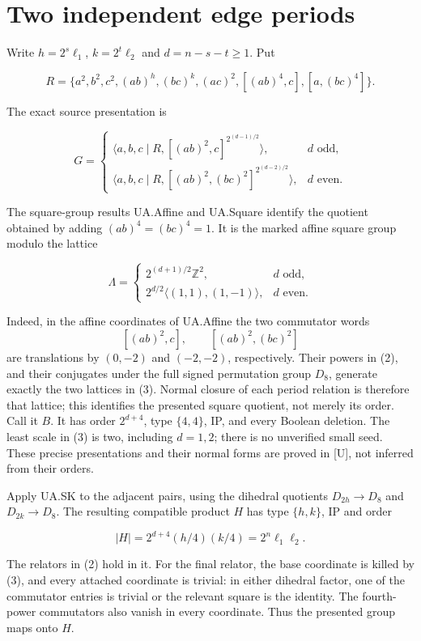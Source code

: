 \section{Two independent edge periods}\label{two-independent-edge-periods}

Write \(h=2^s\ell_1\), \(k=2^t\ell_2\) and \(d=n-s-t\geq1\). Put

\[R=\{a^2,b^2,c^2,(ab)^h,(bc)^k,(ac)^2,
[(ab)^4,c],[a,(bc)^4]\}.\]

The exact source presentation is

\[G=\begin{cases}
\langle a,b,c\mid R,[(ab)^2,c]^{2^{(d-1)/2}}\rangle,&d\text{ odd},\\
\langle a,b,c\mid R,[(ab)^2,(bc)^2]^{2^{(d-2)/2}}\rangle,&d\text{ even}.
\end{cases}\tag{2}\]

The square-group results UA.Affine and UA.Square identify the quotient
obtained by adding \((ab)^4=(bc)^4=1\). It is the marked affine square
group modulo the lattice

\[\Lambda=\begin{cases}
2^{(d+1)/2}\mathbb Z^2,&d\text{ odd},\\
2^{d/2}\langle(1,1),(1,-1)\rangle,&d\text{ even}.
\end{cases}\tag{3}\]

Indeed, in the affine coordinates of UA.Affine the two commutator words
\[
 [(ab)^2,c],\qquad [(ab)^2,(bc)^2]
\]
are translations by $(0,-2)$ and $(-2,-2)$, respectively. Their powers in (2), and their conjugates under the full signed permutation group $D_8$, generate exactly the two lattices in (3). Normal closure of each period relation is therefore that lattice; this identifies the presented square quotient, not merely its order.
Call it \(B\). It has order \(2^{d+4}\), type \(\{4,4\}\), IP, and every
Boolean deletion. The least scale in (3) is two, including \(d=1,2\);
there is no unverified small seed. These precise presentations and their
normal forms are proved in [U], not inferred from their
orders.

Apply UA.SK to the adjacent pairs, using the dihedral quotients
\(D_{2h}\to D_8\) and \(D_{2k}\to D_8\). The resulting compatible product
\(H\) has type \(\{h,k\}\), IP and order

\[ |H|=2^{d+4}(h/4)(k/4)=2^n\ell_1\ell_2.\tag{4}\]

The relators in (2) hold in it. For the final relator, the base coordinate
is killed by (3), and every attached coordinate is trivial: in either
dihedral factor, one of the commutator entries is trivial or the relevant
square is the identity. The fourth-power commutators also vanish in
every coordinate. Thus the presented group maps onto \(H\).

